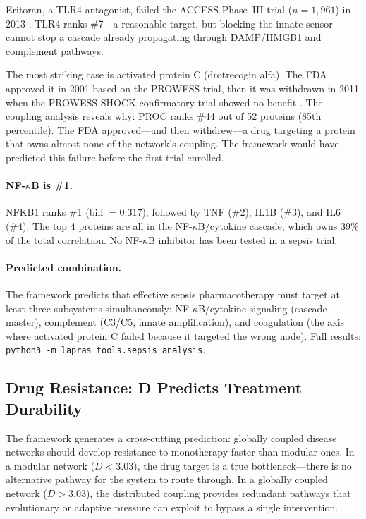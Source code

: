 \documentclass[11pt,a4paper]{article}
\begin{document}
Eritoran, a TLR4 antagonist, failed the ACCESS Phase~III trial ($n = 1{,}961$) in 2013 \citep{opal2013}. TLR4 ranks \#7---a reasonable target, but blocking the innate sensor cannot stop a cascade already propagating through DAMP/HMGB1 and complement pathways.

The most striking case is activated protein C (drotrecogin alfa). The FDA approved it in 2001 based on the PROWESS trial, then it was withdrawn in 2011 when the PROWESS-SHOCK confirmatory trial showed no benefit \citep{ranieri2012}. The coupling analysis reveals why: PROC ranks \#44 out of 52 proteins (85th percentile). The FDA approved---and then withdrew---a drug targeting a protein that owns almost none of the network's coupling. The framework would have predicted this failure before the first trial enrolled.

\paragraph{NF-$\kappa$B is \#1.} NFKB1 ranks \#1 (bill $= 0.317$), followed by TNF (\#2), IL1B (\#3), and IL6 (\#4). The top 4 proteins are all in the NF-$\kappa$B/cytokine cascade, which owns 39\% of the total correlation. No NF-$\kappa$B inhibitor has been tested in a sepsis trial.

\paragraph{Predicted combination.} The framework predicts that effective sepsis pharmacotherapy must target at least three subsystems simultaneously: NF-$\kappa$B/cytokine signaling (cascade master), complement (C3/C5, innate amplification), and coagulation (the axis where activated protein C failed because it targeted the wrong node). Full results: \texttt{python3 -m lapras\_tools.sepsis\_analysis}.

\subsection{Drug Resistance: D Predicts Treatment Durability}

The framework generates a cross-cutting prediction: globally coupled disease networks should develop resistance to monotherapy faster than modular ones. In a modular network ($D < 3.03$), the drug target is a true bottleneck---there is no alternative pathway for the system to route through. In a globally coupled network ($D > 3.03$), the distributed coupling provides redundant pathways that evolutionary or adaptive pressure can exploit to bypass a single intervention.
\end{document}
